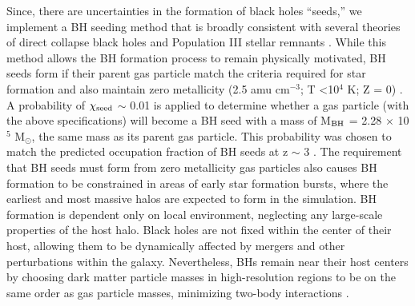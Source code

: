 \documentclass[12pt,headA,chapB]{fiskthesis}
\begin{document}
Since, there are uncertainties in the formation of black holes ``seeds,'' we implement a BH seeding method that is broadly consistent with several theories of direct collapse black holes \citep{Couchman1986, Abel2002, Bromm2004} and Population III stellar remnants \citep{Loeb1994, Eisenstein1995, Koushiappas2004, Begelman2006, Lodato2006}. While this method allows the BH formation process to remain physically motivated, BH seeds form if their parent gas particle match the criteria required for star formation and also maintain zero metallicity (2.5 amu cm$^{-3}$; T \textless 10$^4$ K; Z = 0) \citep{Stinson2006}. A probability of $\chi_{\rm seed}$ $\sim$ 0.01 is applied to determine whether a gas particle (with the above specifications) will become a BH seed with a mass of M$_{\rm BH}$ = 2.28 $\times$ 10$^5$ M$_{\odot}$, the same mass as its parent gas particle. This probability was chosen to match the predicted occupation fraction of BH seeds at z $\sim$ 3 \citep{Volonteri2008}.
The requirement that BH seeds must form from zero metallicity gas particles also causes BH formation to be constrained in areas of early star formation bursts, where the earliest and most massive halos are expected to form in the simulation. BH formation is dependent only on local environment, neglecting any large-scale properties of the host halo. Black holes are not fixed within the center of their host, allowing them to be dynamically affected by mergers and other perturbations within the galaxy. Nevertheless, BHs remain near their host centers by choosing dark matter particle masses in high-resolution regions to be on the same order as gas particle masses, minimizing two-body interactions \citep{Bellovary2011}.
\end{document}
